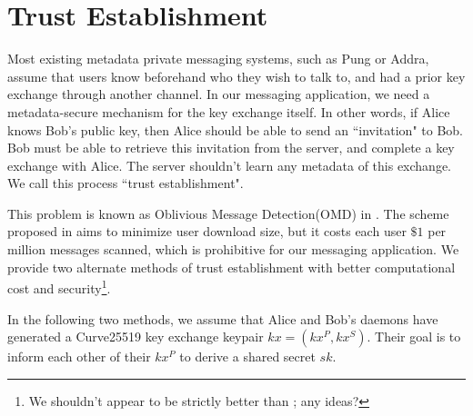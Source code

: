\section{Trust Establishment}
\label{sec:trustestablishment}

Most existing metadata private messaging systems, such as Pung or Addra, assume that users know beforehand who they wish to talk to, and had a prior key exchange through another channel. 
In our messaging application, we need a metadata-secure mechanism for the key exchange itself. 
In other words, if Alice knows Bob's public key, then Alice should be able to send an ``invitation" to Bob.  Bob must be able to retrieve this invitation from the server, and complete a key exchange with Alice. The server shouldn't learn any metadata of this exchange. We call this process ``trust establishment".

This problem is known as Oblivious Message Detection(OMD) in \cite{liutromer2021}. The scheme proposed in \cite{liutromer2021} aims to minimize user download size, but it costs each user $\$ 1$ per million messages scanned, which is prohibitive for our messaging application. We provide two alternate methods of trust establishment with better computational cost and security\footnote{We shouldn't appear to be strictly better than \cite{liutromer2021}; any ideas?}.

In the following two methods, we assume that Alice and Bob's daemons have generated a Curve25519 key exchange keypair $kx = (kx^P, kx^S)$. Their goal is to inform each other of their $kx^P$ to derive a shared secret $sk$.

